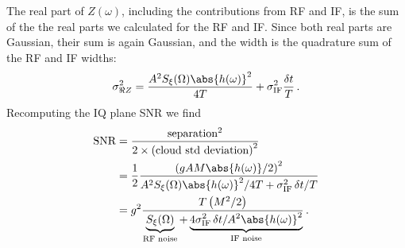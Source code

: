 
The real part of $Z(\omega)$, including the contributions from RF and IF, is the sum of the the real parts we calculated for the RF and IF.
Since both real parts are Gaussian, their sum is again Gaussian, and the width is the quadrature sum of the RF and IF widths:
\begin{equation}
  \sigma_{\Re Z}^2 =
    \frac{A^2 S_\xi(\Omega) \abs{h(\omega)}^2}{4T}
    + \sigma_\text{IF}^2 \frac{\delta t}{T} \, .
\end{equation}
Recomputing the IQ plane SNR we find
\begin{align}
  \text{SNR}
    &= \frac{\text{separation}^2}{2 \times \left( \text{cloud std deviation} \right)^2} \nonumber \\
    &= \frac{1}{2}
       \frac{\left( g A M \abs{h(\omega)} / 2 \right)^2}
            {A^2 S_\xi(\Omega) \abs{h(\omega)}^2 / 4T + \sigma_\text{IF}^2 \, \delta t / T} \nonumber \\
    &= g^2 \frac{T \left( M^2 / 2 \right)}
        {\underbrace{S_\xi(\Omega)}_\text{RF noise} + \underbrace{4 \sigma_\text{IF}^2 \, \delta t / A^2 \abs{h(\omega)}^2}_\text{IF noise}}
  \, .
\end{align}

